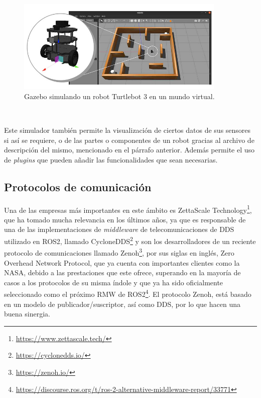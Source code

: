 \begin{figure} [h!]
  \begin{center}
    \includegraphics[width=10cm]{figs/gazebo_sim}
  \end{center}
  \caption{Gazebo simulando un robot Turtlebot 3 en un mundo virtual.}
  \label{fig:gazebo_sim}
\end{figure}\

Este simulador también permite la visualización de ciertos datos de sus sensores
si así se requiere, o de las partes o componentes de un robot gracias al archivo
de descripción del mismo, mencionado en el párrafo anterior.
Además permite el uso de \textit{plugins} que pueden añadir las funcionalidades
que sean necesarias.


\subsection{Protocolos de comunicación}
\label{sec:protocolos_comunicacion}

Una de las empresas más importantes en este ámbito es ZettaScale
Technology\footnote{\url{https://www.zettascale.tech/}}, que ha tomado mucha
relevancia en los últimos años, ya que es responsable de una de las
implementaciones de \textit{middleware} de telecomunicaciones de DDS utilizado
en ROS2, llamado CycloneDDS\footnote{\url{https://cyclonedds.io/}} y son los
desarrolladores de un reciente protocolo de comunicaciones llamado
Zenoh\footnote{\url{https://zenoh.io/}}, por sus siglas en inglés, Zero Overhead
Network Protocol, que ya cuenta con importantes clientes como la NASA, debido a
las prestaciones que este ofrece, superando en la mayoría de casos a los
protocolos de su misma índole y que ya ha sido oficialmente seleccionado como el
próximo RMW de
ROS2\footnote{\url{https://discourse.ros.org/t/ros-2-alternative-middleware-report/33771}}.
El protocolo Zenoh, está basado en un modelo de publicador/suscriptor, así como
DDS, por lo que hacen una buena sinergia.


